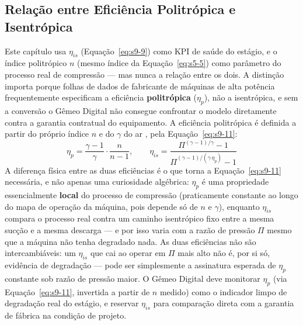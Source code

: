 \documentclass[12pt,a4paper]{article}
\numberwithin{equation}{section}
\numberwithin{table}{section}
\numberwithin{figure}{section}
\begin{document}
{	\subsection{\textbf{Relação entre Eficiência Politrópica e Isentrópica}}
	Este capítulo usa $\eta_{is}$ (Equação~\eqref{eq:s9-9}) como KPI de saúde do estágio, e o índice politrópico $n$ (mesmo índice da Equação~\eqref{eq:s5-5}) como parâmetro do processo real de compressão — mas nunca a relação entre os dois. A distinção importa porque folhas de dados de fabricante de máquinas de alta potência frequentemente especificam a eficiência \textbf{politrópica} ($\eta_p$), não a isentrópica, e sem a conversão o Gêmeo Digital não consegue confrontar o modelo diretamente contra a garantia contratual do equipamento. A eficiência politrópica é definida a partir do próprio índice $n$ e do $\gamma$ do ar \cite{moran, cengel, hanlon}, pela Equação~\eqref{eq:s9-11}:
	\begin{equation}\label{eq:s9-11}
 \eta_p = \frac{\gamma - 1}{\gamma} \cdot \frac{n}{n - 1}, \qquad
 \eta_{is} = \frac{\Pi^{(\gamma-1)/\gamma} - 1}{\Pi^{(\gamma-1)/(\gamma\,\eta_p)} - 1}
\end{equation}
	A diferença física entre as duas eficiências é o que torna a Equação~\eqref{eq:s9-11} necessária, e não apenas uma curiosidade algébrica: $\eta_p$ é uma propriedade essencialmente \textbf{local} do processo de compressão (praticamente constante ao longo do mapa de operação da máquina, pois depende só de $n$ e $\gamma$), enquanto $\eta_{is}$ compara o processo real contra um caminho isentrópico fixo entre a mesma sucção e a mesma descarga — e por isso varia com a razão de pressão $\Pi$ mesmo que a máquina não tenha degradado nada. As duas eficiências não são intercambiáveis: um $\eta_{is}$ que cai ao operar em $\Pi$ mais alto não é, por si só, evidência de degradação — pode ser simplesmente a assinatura esperada de $\eta_p$ constante sob razão de pressão maior. O Gêmeo Digital deve monitorar $\eta_p$ (via Equação~\eqref{eq:s9-11}, invertida a partir de $n$ medido) como o indicador limpo de degradação real do estágio, e reservar $\eta_{is}$ para comparação direta com a garantia de fábrica na condição de projeto.

}
\end{document}
